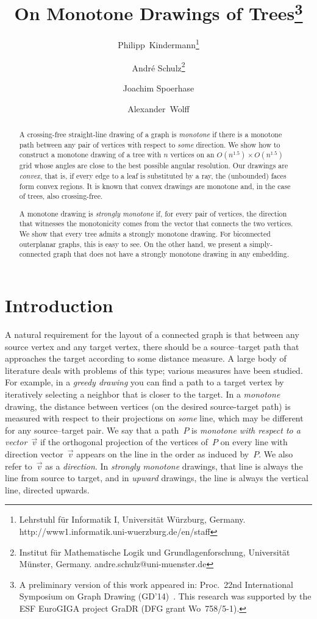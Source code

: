 \documentclass[a4paper,11pt]{article}
\title{On Monotone Drawings of Trees\thanks{A preliminary version of this work 
	appeared in: Proc.\ 22nd International Symposium on Graph Drawing
	(GD'14)~\cite{kssw-omdt-14}. This research was
    supported by the ESF EuroGIGA project GraDR (DFG grant
    Wo~758/5-1).}}
\author{Philipp~Kindermann\thanks{Lehrstuhl f\"ur Informatik I,
  Universit\"at W\"urzburg, Germany.
  \mbox{http://www1.informatik.uni-wuerzburg.de/en/staff}}
\and
Andr{\'e} Schulz\thanks{Institut f\"ur Mathematische Logik und
  Grundlagenforschung, Universit\"at M\"unster, Germany.
  \mbox{andre.schulz@uni-muenster.de}}
\and
  Joachim Spoerhase\footnotemark[2]
\and
Alexander~Wolff\footnotemark[2]
}
\date{}
\theoremstyle{plain}
\begin{document}
\maketitle

\begin{abstract}
  A crossing-free straight-line drawing of a graph is \emph{monotone} if
  there is a monotone path between any pair of vertices with respect
  to \emph{some} direction.  We show how to construct a monotone drawing 
  of a tree with $n$ vertices on an $O(n^{1.5}) \times O(n^{1.5})$ grid
  whose angles are close to the best possible angular resolution.  Our
  drawings are \emph{convex}, that is, if every edge to a leaf is
  substituted by a ray, the (unbounded) faces form convex regions.
  It is known that convex drawings are monotone and, in the case of
  trees, also crossing-free.

  A monotone drawing is \emph{strongly monotone} if, for every pair of
  vertices, the direction that witnesses the monotonicity comes from the
  vector that connects the two vertices.  We show that every tree admits
  a strongly monotone drawing.  For biconnected outerplanar graphs,
  this is easy to see.  On the other hand, we present a
  simply-connected graph that does not have a strongly monotone
  drawing in any embedding.
\end{abstract}

\section{Introduction}

A natural requirement for the layout of a connected graph is that
between any source vertex and any target vertex, there should be a
source--target path that approaches the target according to some
distance measure.  A large body of literature deals with problems of
this type; various measures have been studied.  For example, in a
\emph{greedy drawing} you can find a path to a target vertex by iteratively
selecting a neighbor that is closer to the target.  
In a \emph{monotone} drawing, the distance between vertices (on the desired
source-target path) is measured with respect to their projections on
\emph{some} line, which may be different for any source--target pair.
We say that a path~$P$ is \emph{monotone with respect to a vector~$\vec v$}
if the orthogonal projection of the vertices of~$P$ on every line with direction 
vector~$\vec v$ appears on the line in the order as induced by~$P$.
We also refer to~$\vec v$ as a \emph{direction}.
In \emph{strongly monotone} drawings, that line is always the line
from source to target, and in \emph{upward} drawings, the line is
always the vertical line, directed upwards.
\end{document}
